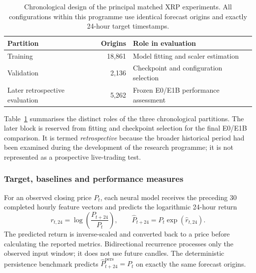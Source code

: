 \begin{table}[!htbp]
\centering\small
\caption{Chronological design of the principal matched XRP experiments. All configurations within this programme use identical forecast origins and exactly 24-hour target timestamps.}
\label{tab:main_partitions}
\begin{tabular}{lrl}
\toprule
Partition & Origins & Role in evaluation \\
\midrule
Training & 18,861 & Model fitting and scaler estimation \\
Validation & 2,136 & Checkpoint and configuration selection \\
Later retrospective evaluation & 5,262 & Frozen E0/E1B performance assessment \\
\bottomrule
\end{tabular}
\end{table}

Table~\ref{tab:main_partitions} summarises the distinct roles of the three chronological partitions. The later block is reserved from fitting and checkpoint selection for the final E0/E1B comparison. It is termed \emph{retrospective} because the broader historical period had been examined during the development of the research programme; it is not represented as a prospective live-trading test.

\subsubsection{Target, baselines and performance measures}

For an observed closing price $P_t$, each neural model receives the preceding 30 completed hourly feature vectors and predicts the logarithmic 24-hour return
\begin{equation}
 r_{t,24}=\log\!\left(\frac{P_{t+24}}{P_t}\right),
 \qquad
 \widehat P_{t+24}=P_t\exp(\widehat r_{t,24}).
 \label{eq:exp_target}
\end{equation}
The predicted return is inverse-scaled and converted back to a price before calculating the reported metrics. Bidirectional recurrence processes only the observed input window; it does not use future candles. The deterministic persistence benchmark predicts $\widehat P_{t+24}^{\mathrm{pers}}=P_t$ on exactly the same forecast origins.

